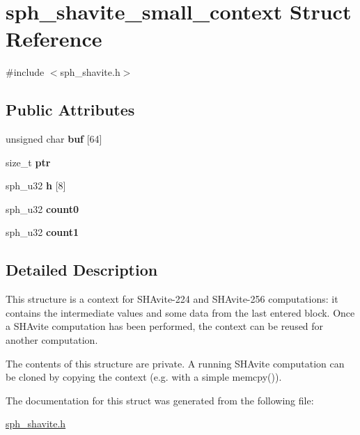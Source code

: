 \hypertarget{structsph__shavite__small__context}{}\section{sph\+\_\+shavite\+\_\+small\+\_\+context Struct Reference}
\label{structsph__shavite__small__context}


{\ttfamily \#include $<$sph\+\_\+shavite.\+h$>$}

\subsection*{Public Attributes}
\begin{DoxyCompactItemize}
\item 
\mbox{\label{structsph__shavite__small__context_ad74589c94e8c2dcb7a5aafdf0ca12d6b}} 
unsigned char {\bfseries buf} \mbox{[}64\mbox{]}
\item 
\mbox{\label{structsph__shavite__small__context_a6fce4cf25f61aa424d73d5eea7655f7f}} 
size\+\_\+t {\bfseries ptr}
\item 
\mbox{\label{structsph__shavite__small__context_a178c52fd8f4723c152891928cdf9428f}} 
sph\+\_\+u32 {\bfseries h} \mbox{[}8\mbox{]}
\item 
\mbox{\label{structsph__shavite__small__context_a61e5866a6d05a94f093df7bb0ba7e719}} 
sph\+\_\+u32 {\bfseries count0}
\item 
\mbox{\label{structsph__shavite__small__context_a19e4d2f46dcf6ac31d8cbde7f7aceeea}} 
sph\+\_\+u32 {\bfseries count1}
\end{DoxyCompactItemize}


\subsection{Detailed Description}
This structure is a context for S\+H\+Avite-\/224 and S\+H\+Avite-\/256 computations\+: it contains the intermediate values and some data from the last entered block. Once a S\+H\+Avite computation has been performed, the context can be reused for another computation.

The contents of this structure are private. A running S\+H\+Avite computation can be cloned by copying the context (e.\+g. with a simple {\ttfamily memcpy()}). 

The documentation for this struct was generated from the following file\+:\begin{DoxyCompactItemize}
\item 
\mbox{\hyperlink{sph__shavite_8h}{sph\+\_\+shavite.\+h}}\end{DoxyCompactItemize}
